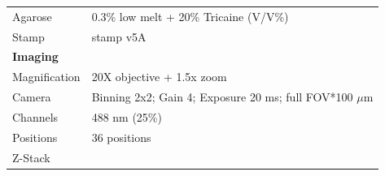 \documentclass[11pt,singlespacinge,twoside]{reedthesis} %
\begin{document}
\begin{longtable}[]{@{}ll@{}}
\begin{minipage}[t]{0.21\columnwidth}
Agarose\strut
\end{minipage} & \begin{minipage}[t]{0.73\columnwidth}\raggedright
0.3\% low melt + 20\% Tricaine (V/V\%)\strut
\end{minipage}\tabularnewline
\begin{minipage}[t]{0.21\columnwidth}\raggedright
Stamp\strut
\end{minipage} & \begin{minipage}[t]{0.73\columnwidth}\raggedright
stamp v5A\strut
\end{minipage}\tabularnewline
\begin{minipage}[t]{0.21\columnwidth}\raggedright
\textbf{Imaging}\strut
\end{minipage} & \begin{minipage}[t]{0.73\columnwidth}\raggedright
\strut
\end{minipage}\tabularnewline
\begin{minipage}[t]{0.21\columnwidth}\raggedright
Magnification\strut
\end{minipage} & \begin{minipage}[t]{0.73\columnwidth}\raggedright
20X objective + 1.5x zoom\strut
\end{minipage}\tabularnewline
\begin{minipage}[t]{0.21\columnwidth}\raggedright
Camera\strut
\end{minipage} & \begin{minipage}[t]{0.73\columnwidth}\raggedright
Binning 2x2; Gain 4; Exposure 20 ms; full FOV*100 \(\mu\)m\strut
\end{minipage}\tabularnewline
\begin{minipage}[t]{0.21\columnwidth}\raggedright
Channels\strut
\end{minipage} & \begin{minipage}[t]{0.73\columnwidth}\raggedright
488 nm (25\%)\strut
\end{minipage}\tabularnewline
\begin{minipage}[t]{0.21\columnwidth}\raggedright
Positions\strut
\end{minipage} & \begin{minipage}[t]{0.73\columnwidth}\raggedright
36 positions\strut
\end{minipage}\tabularnewline
\begin{minipage}[t]{0.21\columnwidth}\raggedright
Z-Stack\strut
\end{minipage} & \begin{minipage}[t]{0.73\columnwidth}\raggedright

\end{minipage}
\end{longtable}
\end{document}
